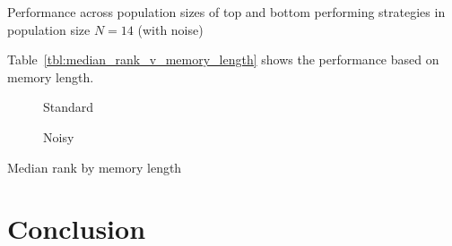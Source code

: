 \documentclass{article}
\begin{document}
\begin{table}[!hbtp]
    \centering
        \begin{subfigure}[t]{\textwidth}
            \centering
                
            \label{tbl:top_five_in_size_14_noisy}
        \end{subfigure}

        \begin{subfigure}[t]{\textwidth}
            \centering
                
            \label{tbl:bottom_five_in_size_14_noisy}
        \end{subfigure}%
        \caption{Performance across population sizes of top and bottom
        performing strategies in population size \(N=14\) (with noise)}
        \label{tbl:ranks_in_size_14_noisy}
\end{table}

Table~\ref{tbl:median_rank_v_memory_length} shows the performance based on
memory length.

\begin{table}[!hbtp]
    \centering
        \begin{subfigure}[t]{\textwidth}
            \centering
                
            \caption{Standard}
            \label{tbl:top_five_in_size_14_noisy}
        \end{subfigure}

        \begin{subfigure}[t]{\textwidth}
            \centering
                
            \caption{Noisy}
            \label{tbl:bottom_five_in_size_14_noisy}
        \end{subfigure}%
        \caption{Median rank by memory length}
        \label{tbl:median_rank_v_memory_length}
\end{table}




\section{Conclusion}\label{sec:conclusion}
\end{document}
